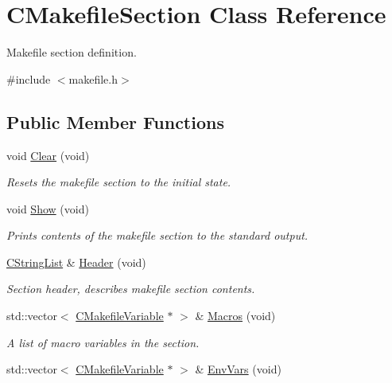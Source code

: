 \hypertarget{classCMakefileSection}{\section{C\-Makefile\-Section Class Reference}
\label{classCMakefileSection}
}


Makefile section definition.  




{\ttfamily \#include $<$makefile.\-h$>$}

\subsection*{Public Member Functions}
\begin{DoxyCompactItemize}
\item 
void \hyperlink{classCMakefileSection_af08b2da5cf2bea30f88d82e7076288ea}{Clear} (void)
\begin{DoxyCompactList}\small\item\em Resets the makefile section to the initial state. \end{DoxyCompactList}\item 
void \hyperlink{classCMakefileSection_a190c932398264095c33f9aed3162fa4c}{Show} (void)
\begin{DoxyCompactList}\small\item\em Prints contents of the makefile section to the standard output. \end{DoxyCompactList}\item 
\hyperlink{classCStringList}{C\-String\-List} \& \hyperlink{classCMakefileSection_a59809cace68f470cfe6e8b6f9af3765c}{Header} (void)
\begin{DoxyCompactList}\small\item\em Section header, describes makefile section contents. \end{DoxyCompactList}\item 
std\-::vector$<$ \hyperlink{classCMakefileVariable}{C\-Makefile\-Variable} $\ast$ $>$ \& \hyperlink{classCMakefileSection_aefd7a83c39397eff928e487ef5e4830f}{Macros} (void)
\begin{DoxyCompactList}\small\item\em A list of macro variables in the section. \end{DoxyCompactList}\item 
std\-::vector$<$ \hyperlink{classCMakefileVariable}{C\-Makefile\-Variable} $\ast$ $>$ \& \hyperlink{classCMakefileSection_a1d5ca98517803f8cb61bbbcdb9a4617f}{Env\-Vars} (void)

\end{DoxyCompactItemize}
